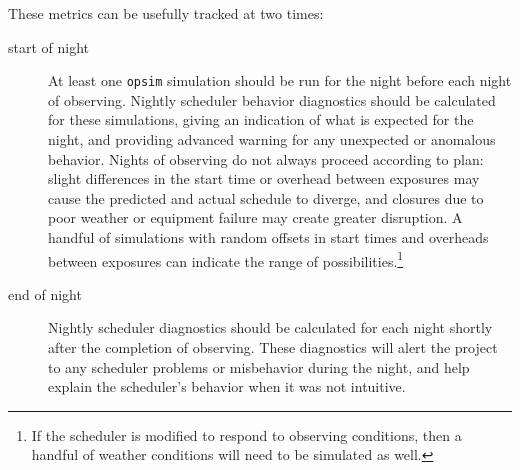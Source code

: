 These metrics can be usefully tracked at two times:
\begin{description}
\item[{start of night}] At least one \texttt{opsim} simulation should be run for the night before each night of observing. Nightly scheduler behavior diagnostics should be calculated for these simulations, giving an indication of what is expected for the night, and providing advanced warning for any unexpected or anomalous behavior. Nights of observing do not always proceed according to plan: slight differences in the start time or overhead between exposures may cause the predicted and actual schedule to diverge, and closures due to poor weather or equipment failure may create greater disruption. A handful of simulations with random offsets in start times and overheads between exposures can indicate the range of possibilities.\footnote{If the scheduler is modified to respond to observing conditions, then a handful of weather conditions will need to be simulated as well.}
\item[{end of night}] Nightly scheduler diagnostics should be calculated for each night shortly after the completion of observing. These diagnostics will alert the project to any scheduler problems or misbehavior during the night, and help explain the scheduler's behavior when it was not intuitive.
\end{description}

